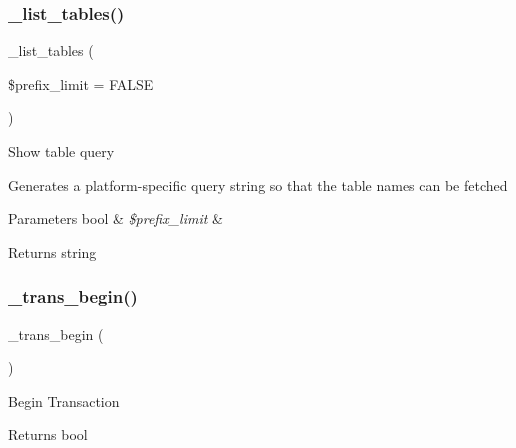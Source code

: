 \subsubsection{\texorpdfstring{\+\_\+list\+\_\+tables()}{\_list\_tables()}}
{\footnotesize\ttfamily \+\_\+list\+\_\+tables (\begin{DoxyParamCaption}\item[{}]{\$prefix\+\_\+limit = {\ttfamily FALSE} }\end{DoxyParamCaption})\hspace{0.3cm}{\ttfamily [protected]}}

Show table query

Generates a platform-\/specific query string so that the table names can be fetched


\begin{DoxyParams}[1]{Parameters}
bool & {\em \$prefix\+\_\+limit} & \\
\hline
\end{DoxyParams}
\begin{DoxyReturn}{Returns}
string 
\end{DoxyReturn}
\mbox{\label{class_c_i___d_b__postgre__driver_ac81ac882c1d54347d810199a15856aac}} 
\subsubsection{\texorpdfstring{\+\_\+trans\+\_\+begin()}{\_trans\_begin()}}
{\footnotesize\ttfamily \+\_\+trans\+\_\+begin (\begin{DoxyParamCaption}{ }\end{DoxyParamCaption})\hspace{0.3cm}{\ttfamily [protected]}}

Begin Transaction

\begin{DoxyReturn}{Returns}
bool 
\end{DoxyReturn}
\mbox{\label{class_c_i___d_b__postgre__driver_a6fe7f373e0b11cfae23a5f41c0b35dda}} 

